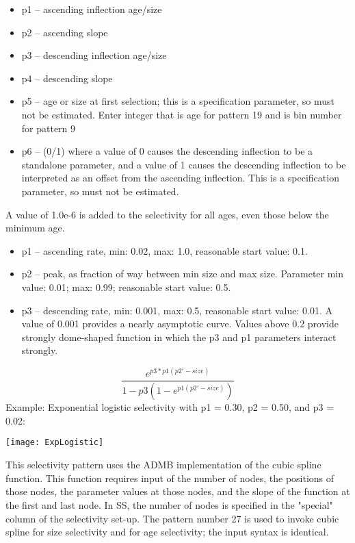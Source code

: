 	\begin{itemize}
		\item p1 – ascending inflection age/size
		\item p2 – ascending slope
		\item p3 – descending inflection age/size
		\item p4 – descending slope
		\item p5 – age or size at first selection; this is a specification parameter, so must not be estimated.  Enter integer that is age for pattern 19 and is bin number for pattern 9
		\item p6 – (0/1)  where a value of 0 causes the descending inflection to be a standalone parameter, and a value of 1 causes the descending inflection to be interpreted as an offset from the ascending inflection.  This is a specification parameter, so must not be estimated.
	\end{itemize}
A value of 1.0e-6 is added to the selectivity for all ages, even those below the minimum age.

	\begin{itemize}
		\item p1 – ascending rate, min: 0.02, max: 1.0, reasonable start value: 0.1.
		\item p2 – peak, as fraction of way between min size and max size.  Parameter min value:  0.01; max:  0.99; reasonable start value: 0.5.
		\item p3 – descending rate, min: 0.001, max: 0.5, reasonable start value:  0.01.  A value of 0.001 provides a nearly asymptotic curve. Values above 0.2 provide strongly dome-shaped function in which the p3 and p1 parameters interact strongly.
	\end{itemize}
	\begin{equation}
	\frac{e^{p3*p1(p2'-size)}}{1-p3(1-e^{p1(p2'-size)})}
	\end{equation}
	Example: Exponential logistic selectivity with p1 = 0.30, p2 = 0.50, and p3 = 0.02:\\
	\begin{center}
		\texttt{[image: ExpLogistic]}
	\end{center}

This selectivity pattern uses the ADMB implementation of the cubic spline function. This function requires input of the number of nodes, the positions of those nodes, the parameter values at those nodes, and the slope of the function at the first and last node. In SS, the number of nodes is specified in the "special" column of the selectivity set-up.  The pattern number 27 is used to invoke cubic spline for size selectivity and for age selectivity; the input syntax is identical.
	
